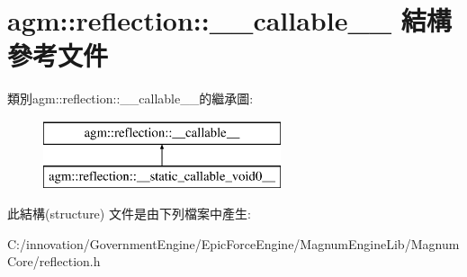 \hypertarget{structagm_1_1reflection_1_1____callable____}{}\section{agm\+:\+:reflection\+:\+:\+\_\+\+\_\+callable\+\_\+\+\_\+ 結構 參考文件}
\label{structagm_1_1reflection_1_1____callable____}
類別agm\+:\+:reflection\+:\+:\+\_\+\+\_\+callable\+\_\+\+\_\+的繼承圖\+:\begin{figure}[H]
\begin{center}
\leavevmode
\includegraphics[height=2.000000cm]{structagm_1_1reflection_1_1____callable____}
\end{center}
\end{figure}


此結構(structure) 文件是由下列檔案中產生\+:\begin{DoxyCompactItemize}
\item 
C\+:/innovation/\+Government\+Engine/\+Epic\+Force\+Engine/\+Magnum\+Engine\+Lib/\+Magnum\+Core/reflection.\+h\end{DoxyCompactItemize}
